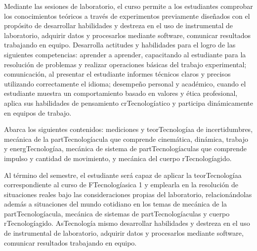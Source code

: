 \begin{syllabus}


\begin{justification}
Mediante las sesiones de laboratorio, el curso permite a los estudiantes comprobar los conocimientos teóricos a través de experimentos previamente diseñados con el propósito de desarrollar habilidades y destreza en el uso de instrumental de laboratorio, adquirir datos y procesarlos mediante software, comunicar resultados trabajando en equipo. Desarrolla actitudes y habilidades para el logro de las siguientes competencias: aprender a aprender, capacitando al estudiante para la resolución de problemas y realizar operaciones básicas del trabajo experimental; comunicación, al presentar el estudiante informes técnicos claros y precisos utilizando correctamente el idioma; desempeño personal y académico, cuando el estudiante muestra un comportamiento basado en valores y ética profesional, aplica sus habilidades de pensamiento crTecnologíatico y participa dinámicamente en equipos de trabajo.

Abarca los siguientes contenidos: mediciones y teorTecnologíaa de incertidumbres, mecánica de la partTecnologíacula que comprende cinemática, dinámica, trabajo y energTecnologíaa, mecánica de sistema de partTecnologíaculas que comprende impulso y cantidad de movimiento, y mecánica del cuerpo rTecnologíagido.
\end{justification}

\begin{goals}
\item Al término del semestre, el estudiante será capaz de aplicar la teorTecnologíaa correspondiente al curso de FTecnologíasica 1 y emplearla en la resolución de situaciones reales bajo las consideraciones propias del laboratorio, relacionándolas además a situaciones del mundo cotidiano en los temas de mecánica de la partTecnologíacula, mecánica de sistemas de partTecnologíaculas y cuerpo rTecnologíagido. AsTecnología mismo desarrollar habilidades y destreza en el uso de instrumental de laboratorio, adquirir datos y procesarlos mediante software, comunicar resultados trabajando en equipo.
\end{goals}

\begin{outcomes}
\item {}
\item {}
\end{outcomes}


\end{syllabus}
